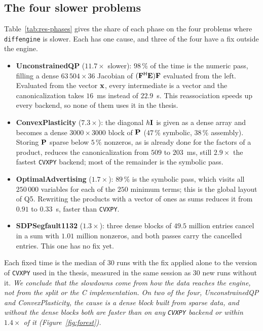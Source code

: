\documentclass[letterpaper,12pt]{article}
\begin{document}
\subsection{The four slower problems}\label{sec:res-slower}
Table~\ref{tab:res-phases} gives the share of each phase on the four problems where
\texttt{diffengine} is slower. Each has one cause, and three of the four have a fix outside the
engine.
\begin{itemize}[leftmargin=*]
\item \textbf{UnconstrainedQP} ($11.7\times$ slower): $98\,\%$ of the time is the numeric pass,
filling a dense $63\,504 \times 36$ Jacobian of $(\mathbf{F}^{\mathsf{H}}\mathbf{E})\mathbf{F}$
evaluated from the left. Evaluated from the vector $\mathbf{x}$, every intermediate is a vector
and the canonicalization takes $16$~ms instead of $22.9$~s. This reassociation speeds up every backend, so none of
them uses it in the thesis.
\item \textbf{ConvexPlasticity} ($7.3\times$): the diagonal $h\mathbf{I}$ is given as a dense array
and becomes a dense $3000 \times 3000$ block of $\mathbf{P}$ ($47\,\%$ symbolic, $38\,\%$
assembly). Storing $\mathbf{P}$ sparse below $5\,\%$ nonzeros, as is already done for the
factors of a product, reduces the canonicalization from $509$ to $203$~ms, still $2.9\times$
the fastest \texttt{CVXPY} backend; most of the remainder is the symbolic pass.
\item \textbf{OptimalAdvertising} ($1.7\times$): $89\,\%$ is the symbolic pass, which visits all
$250\,000$ variables for each of the $250$ minimum terms; this is the global layout of Q5.
Rewriting the products with a vector of ones as sums reduces it from $0.91$ to $0.33$~s, faster
than \texttt{CVXPY}.
\item \textbf{SDPSegfault1132} ($1.3\times$): three dense blocks of $49.5$ million entries
cancel in a sum with $1.01$ million nonzeros, and both passes carry the cancelled entries. This
one has no fix yet.
\end{itemize}
Each fixed time is the median of $30$ runs with the fix applied alone to the version of
\texttt{CVXPY} used in the thesis, measured in the same session as $30$ new runs without it.
\emph{We conclude that the slowdowns come from how the data reaches the engine, not from the
split or the C implementation. On two of the four, UnconstrainedQP and ConvexPlasticity, the
cause is a dense block built from sparse data, and without the dense blocks both are faster than
on any \texttt{CVXPY} backend or within $1.4\times$ of it (Figure~\ref{fig:forest}).}
\end{document}
